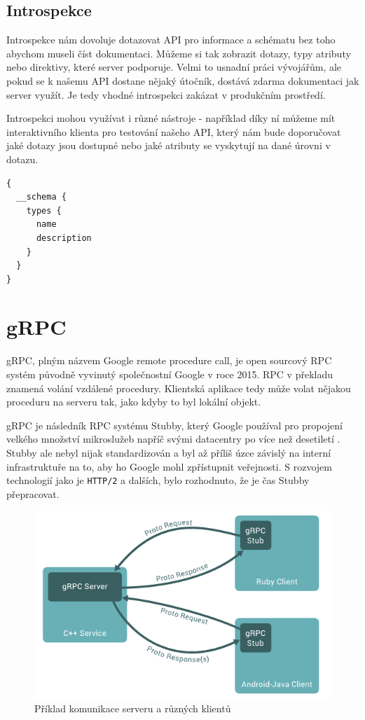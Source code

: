 \documentclass[thesis=M,czech]{FITthesis}[2019/12/23]
\begin{document}
\subsection{Introspekce}
\begin{sloppypar}
Introspekce nám dovoluje dotazovat API pro informace a schématu bez toho abychom museli číst dokumentaci. Můžeme si tak zobrazit dotazy, typy atributy nebo direktivy, které server podporuje. Velmi to usnadní práci vývojářům, ale pokud se k našemu API dostane nějaký útočník, dostává zdarma dokumentaci jak server využít. Je tedy vhodné introspekci zakázat v produkčním prostředí.
\end{sloppypar}
Introspekci mohou využívat i různé nástroje - například díky ní můžeme mít interaktivního klienta pro testování našeho API, který nám bude doporučovat jaké dotazy jsou dostupné  nebo jaké atributy se vyskytují na dané úrovni v dotazu.

\begin{verbatim}
{
  __schema {
    types {
      name
      description 
    }
  }
}
\end{verbatim}

\section{gRPC}
gRPC, plným názvem Google remote procedure call, je open sourcový RPC systém původně vyvinutý společnostní Google v roce 2015. RPC v překladu znamená volání vzdálené procedury. Klientská aplikace tedy může volat nějakou proceduru na serveru tak, jako kdyby to byl lokální objekt.

gRPC je následník RPC systému Stubby, který Google používal pro propojení velkého množství mikroslužeb napříč svými datacentry po více než desetiletí \cite{grpc}. Stubby ale nebyl nijak standardizován a byl až příliš úzce závislý na interní infrastruktuře na to, aby ho Google mohl zpřístupnit veřejnosti. S rozvojem technologií jako je \texttt{HTTP/2} a dalších, bylo rozhodnuto, že je čas Stubby přepracovat.

\begin{figure}[H]
    \includegraphics[width=\linewidth]{img/grpc-overview.png}
    \caption{Příklad komunikace serveru a různých klientů}
	\label{grpc-overview}
\end{figure}
\end{document}
